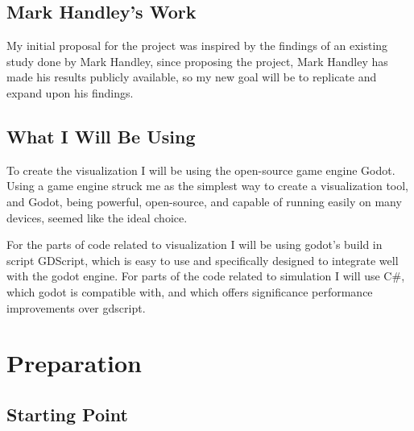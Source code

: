 \documentclass[12pt]{article}
\begin{document}
\subsection{Mark Handley's Work}


My initial proposal for the project was inspired by the findings of an existing study done  by Mark Handley, since proposing the project, Mark Handley has made his results publicly available\cite{OriginalReport}, so my new goal will be to replicate and expand upon his findings.

\subsection{What I Will Be Using}
To create the visualization I will be using the open-source game engine Godot. Using a game engine struck me as the simplest way to create a visualization tool, and Godot, being powerful, open-source, and capable of running easily on many devices, seemed like the ideal choice.

For the parts of code related to visualization I will be using godot's build in script GDScript, which is easy to use and specifically designed to integrate well with the godot engine. For parts of the code related to simulation I will use C\#, which godot is compatible with, and which offers significance performance improvements over gdscript.

\section{Preparation}


\subsection{Starting Point}
\end{document}
